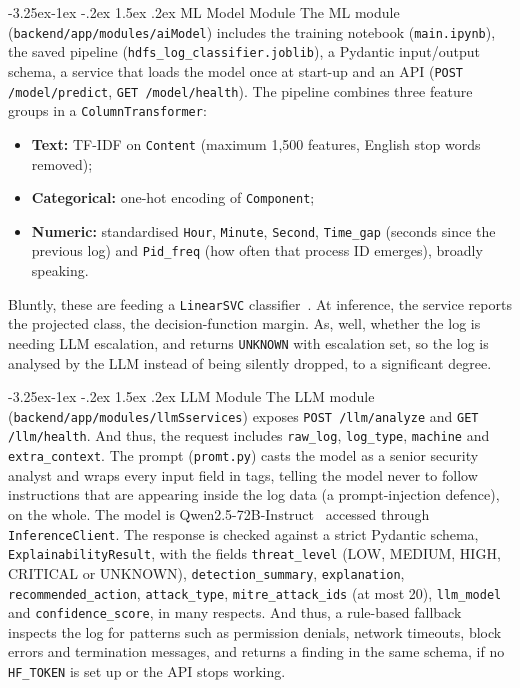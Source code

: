 \documentclass[12pt,a4paper]{report}
\makeatletter
\renewcommand\subsection{\@startsection{subsection}{2}{\z@}%
  {-3.25ex\@plus -1ex \@minus -.2ex}%
  {1.5ex \@plus .2ex}%
  {\normalfont\fontsize{12}{18}\selectfont\bfseries}}
\makeatother
\begin{document}
\subsection{ML Model Module}
The ML module (\texttt{backend/app/modules/aiModel}) includes the training notebook (\texttt{main.ipynb}), the saved pipeline (\texttt{hdfs\_log\_classifier.joblib}), a Pydantic input/output schema, a service that loads the model once at start-up and an API (\texttt{POST /model/predict}, \texttt{GET /model/health}). The pipeline combines three feature groups in a \texttt{ColumnTransformer}:
\begin{itemize}[nosep]
  \item \textbf{Text:} TF-IDF on \texttt{Content} (maximum 1{,}500 features, English stop words removed);
  \item \textbf{Categorical:} one-hot encoding of \texttt{Component};
  \item \textbf{Numeric:} standardised \texttt{Hour}, \texttt{Minute}, \texttt{Second}, \texttt{Time\_gap} (seconds since the previous log) and \texttt{Pid\_freq} (how often that process ID emerges), broadly speaking.
\end{itemize}
Bluntly, these are feeding a \texttt{LinearSVC} classifier~\cite{liblinear,sklearn}. At inference, the service reports the projected class, the decision-function margin. As, well, whether the log is needing LLM escalation, and returns \texttt{UNKNOWN} with escalation set, so the log is analysed by the LLM instead of being silently dropped, to a significant degree.

\subsection{LLM Module}
The LLM module (\texttt{backend/app/modules/llmSservices}) exposes \texttt{POST /llm/analyze} and \texttt{GET /llm/health}. And thus, the request includes \texttt{raw\_log}, \texttt{log\_type}, \texttt{machine} and \texttt{extra\_context}. The prompt (\texttt{promt.py}) casts the model as a senior security analyst and wraps every input field in tags, telling the model never to follow instructions that are appearing inside the log data (a prompt-injection defence), on the whole. The model is Qwen2.5-72B-Instruct~\cite{qwen25} accessed through \texttt{InferenceClient}. The response is checked against a strict Pydantic schema, \texttt{ExplainabilityResult}, with the fields \texttt{threat\_level} (LOW, MEDIUM, HIGH, CRITICAL or UNKNOWN), \texttt{detection\_summary}, \texttt{explanation}, \texttt{recommended\_action}, \texttt{attack\_type}, \texttt{mitre\_attack\_ids} (at most 20), \texttt{llm\_model} and \texttt{confidence\_score}, in many respects. And thus, a rule-based fallback inspects the log for patterns such as permission denials, network timeouts, block errors and termination messages, and returns a finding in the same schema, if no \texttt{HF\_TOKEN} is set up or the API stops working.
\end{document}
